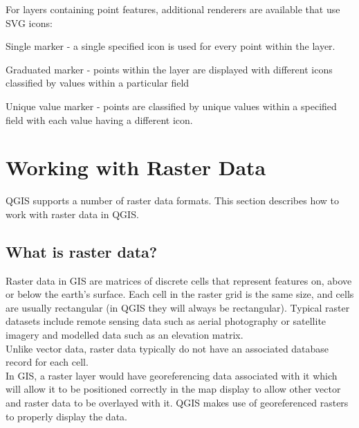 \documentclass[10pt,english]{article}
\begin{document}
\begin{onehalfspace}
For layers containing point features, additional renderers are
available that use SVG icons:

\begin{compactdesc}
    \item[Single marker] - a single specified icon is used for
    every point within the layer.
    \item[Graduated marker] - points within the layer are
    displayed with different icons classified by values within a
    particular field
    \item[Unique value marker] - points are classified by unique
    values within a specified field with each value having a
    different icon.
\end{compactdesc}


\section{Working with Raster Data}
QGIS supports a number of raster data formats. This section describes how to work with raster data in QGIS.
\subsection{What is raster data?}

Raster data in GIS are matrices of discrete cells that represent features on, above or below the earth's surface. Each cell in the raster grid is the same size, and cells are usually rectangular (in QGIS they will always be rectangular). Typical raster datasets include remote sensing data such as aerial photography or satellite imagery and modelled data such as an elevation matrix.\\

Unlike vector data, raster data typically do not have an associated database record for each cell.\\

In GIS, a raster layer would have georeferencing data associated with it which will allow it to be positioned correctly in the map display to allow other vector and raster data to be overlayed with it. QGIS makes use of georeferenced rasters to properly display the data.
	

\end{onehalfspace}
\end{document}
